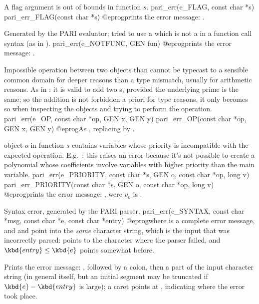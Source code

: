  A flag argument is out of bounds in function $s$.
\bprog
  pari_err(e_FLAG, const char *s)
  pari_err_FLAG(const char *s)
@eprog\noindent prints the error message: .

 Generated by the PARI evaluator; tried to use a
 which is not a  in a function call syntax (as in
).
\bprog
  pari_err(e_NOTFUNC, GEN fun)
@eprog\noindent prints the error message: .

 Impossible operation between two objects than cannot be
typecast to a sensible common domain for deeper reasons than a type mismatch,
usually for arithmetic reasons. As in : it is valid to add
two s, provided the underlying prime is the same; so the addition
is not forbidden a priori for type reasons, it only becomes so when
inspecting the objects and trying to perform the operation.
\bprog
  pari_err(e_OP, const char *op, GEN x, GEN y)
  pari_err_OP(const char *op, GEN x, GEN y)
@eprog\noindent As , replacing  by
.

 object $o$ in function $s$ contains
variables whose priority is incompatible with the expected operation.
E.g.~: this raises an error because it's not possible to
create a polynomial whose coefficients involve variables with higher priority
than the main variable.
\bprog
  pari_err(e_PRIORITY, const char *s, GEN o, const char *op, long v)
  pari_err_PRIORITY(const char *s, GEN o, const char *op, long v)
@eprog\noindent prints the error message: , were $v_o$ is .

 Syntax error, generated by the PARI parser.
\bprog
  pari_err(e_SYNTAX, const char *msg, const char *e, const char *entry)
@eprog\noindent where  is a complete error message, and  and
 point into the \emph{same} character string, which is the input
that was incorrectly parsed:  points to the character where the parser
failed, and $\kbd{entry}\leq \kbd{e}$ points somewhat before.

\noindent Prints the error message: , followed by a colon, then
a part of the input character string (in general  itself, but an
initial segment may be truncated if $\kbd{e}-\kbd{entry}$ is large); a caret
points at , indicating where the error took place.

